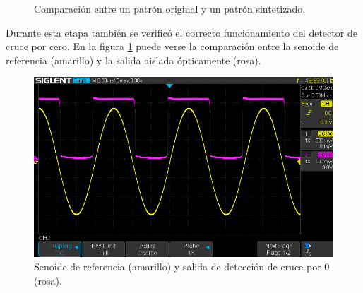\vspace{5mm}

\begin{figure}[htp] 
    \centering
    \hfill%
    \caption{Comparación entre un patrón original y un patrón sintetizado.}
\end{figure}

Durante esta etapa también se verificó el correcto funcionamiento del detector de cruce por cero. En la figura \ref{fig:zeroCross} puede verse la comparación entre la senoide de referencia (amarillo)  y la salida aislada ópticamente (rosa).

\vspace{5mm}

\begin{figure}[ht]
	\centering
	\includegraphics[width=133mm]{./Figures/zeroCross.png}
	\caption{Senoide de referencia (amarillo) y salida de detección de cruce por 0 (rosa).}
	\label{fig:zeroCross}
\end{figure}

